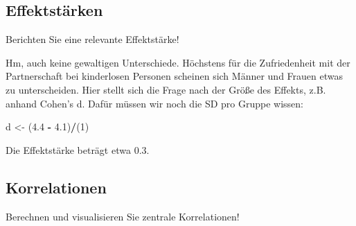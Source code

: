 \documentclass[12pt,ngerman,]{book}
\makeatletter
\newenvironment{Shaded}{\begin{snugshade}}{\end{snugshade}}
\newcommand{\KeywordTok}[1]{\textcolor[rgb]{0.13,0.29,0.53}{\textbf{#1}}}
\newcommand{\DataTypeTok}[1]{\textcolor[rgb]{0.13,0.29,0.53}{#1}}
\newcommand{\DecValTok}[1]{\textcolor[rgb]{0.00,0.00,0.81}{#1}}
\newcommand{\FloatTok}[1]{\textcolor[rgb]{0.00,0.00,0.81}{#1}}
\newcommand{\StringTok}[1]{\textcolor[rgb]{0.31,0.60,0.02}{#1}}
\newcommand{\CommentTok}[1]{\textcolor[rgb]{0.56,0.35,0.01}{\textit{#1}}}
\newcommand{\OperatorTok}[1]{\textcolor[rgb]{0.81,0.36,0.00}{\textbf{#1}}}
\newcommand{\NormalTok}[1]{#1}
\newenvironment{kframe}{%
\medskip{}
\setlength{\fboxsep}{.8em}
 \def\at@end@of@kframe{}%
 \ifinner\ifhmode%
  \def\at@end@of@kframe{\end{minipage}}%
  \begin{minipage}{\columnwidth}%
 \fi\fi%
 \def\FrameCommand##1{\hskip\@totalleftmargin \hskip-\fboxsep
 \colorbox{shadecolor}{##1}\hskip-\fboxsep
     \hskip-\linewidth \hskip-\@totalleftmargin \hskip\columnwidth}%
 \MakeFramed {\advance\hsize-\width
   \@totalleftmargin\z@ \linewidth\hsize
   \@setminipage}}%
 {\par\unskip\endMakeFramed%
 \at@end@of@kframe}
\renewenvironment{Shaded}{\begin{kframe}}{\end{kframe}}
\theoremstyle{definition}
\theoremstyle{definition}
\theoremstyle{remark}
\makeatother
\begin{document}
\subsection{Effektstärken}\label{effektstarken}

Berichten Sie eine relevante Effektstärke!

Hm, auch keine gewaltigen Unterschiede. Höchstens für die Zufriedenheit
mit der Partnerschaft bei kinderlosen Personen scheinen sich Männer und
Frauen etwas zu unterscheiden. Hier stellt sich die Frage nach der Größe
des Effekts, z.B. anhand Cohen's d. Dafür müssen wir noch die SD pro
Gruppe wissen:

\begin{Shaded}
\end{Shaded}

\begin{Shaded}
\begin{Highlighting}[]
\NormalTok{d <-}\StringTok{ }\NormalTok{(}\FloatTok{4.4} \OperatorTok{-}\StringTok{ }\FloatTok{4.1}\NormalTok{)}\OperatorTok{/}\NormalTok{(}\DecValTok{1}\NormalTok{)}
\end{Highlighting}
\end{Shaded}

Die Effektstärke beträgt etwa 0.3.

\subsection{Korrelationen}\label{korrelationen}

Berechnen und visualisieren Sie zentrale Korrelationen!

\begin{Shaded}
\end{Shaded}
\end{document}
